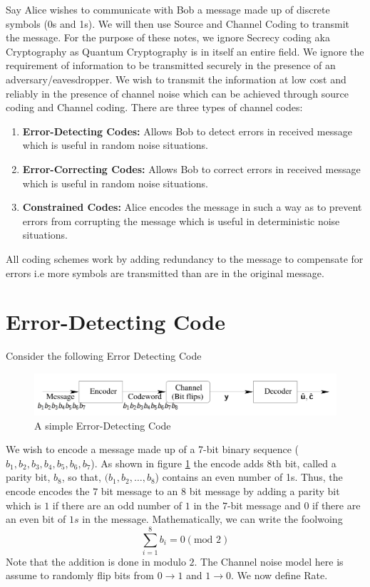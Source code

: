 \documentclass[12pt, oneside]{book}
\theoremstyle{definition}
\theoremstyle{definition}
\theoremstyle{remark}
\begin{document}
Say Alice wishes to communicate with Bob a message made up of discrete symbols (0s and 1s). We will then use Source and Channel Coding to transmit the message. For the purpose of these notes, we ignore Secrecy coding aka Cryptography as Quantum Cryptography is in itself an entire field. We ignore the requirement of information to be transmitted securely in the presence of an adversary/eavesdropper. We wish to transmit the information at low cost and reliably in the presence of channel noise which can be achieved through source coding and Channel coding. There are three types of channel codes:
\begin{enumerate}
    \item \textbf{Error-Detecting Codes:} Allows Bob to detect errors in received message which is useful in random noise situations.
    \item \textbf{Error-Correcting Codes:} Allows Bob to correct errors in received message which is useful in random noise situations.
    \item \textbf{Constrained Codes:} Alice encodes the message in such a way as to prevent errors from corrupting the message which is useful in deterministic noise situations.
\end{enumerate}
\begin{importantnote}
    All coding schemes work by adding redundancy to the message to compensate for errors i.e more symbols are transmitted than are in the original message.
\end{importantnote}

\section{Error-Detecting Code}
Consider the following Error Detecting Code
\begin{figure}[h]
    \centering
    \includegraphics[width=0.75\linewidth]{../images/error-dect.png}
    \caption{A simple Error-Detecting Code}
    \label{fig:err-det}
\end{figure}
We wish to encode a message made up of a 7-bit binary sequence ($b_1,b_2,b_3,b_4,b_5,b_6,b_7$). As shown in figure \ref{fig:err-det} the encode adds 8th bit, called a parity bit, $b_8$, so that, $(b_1,b_2,\ldots,b_8$) contains an even number of 1s. Thus, the encode encodes the $7$ bit message to an $8$ bit message by adding a parity bit which is $1$ if there are an odd number of $1$ in the $7$-bit message and $0$ if there are an even bit of $1s$ in the message. Mathematically, we can write the foolwoing 
\[
\sum_{i=1}^{8} b_i=0 (\text{mod }2)
\]
Note that the addition is done in modulo $2$. The Channel noise model here is assume to randomly flip bits from $0\rightarrow 1$ and $1\rightarrow 0$. We now define Rate.
\end{document}
